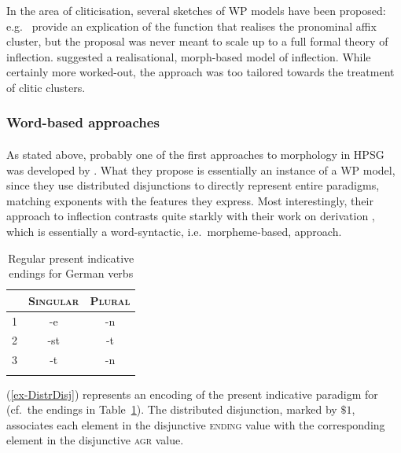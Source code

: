 \documentclass[output=paper
 	        ,biblatex
                ,babelshorthands
                ,newtxmath
                ,draftmode
                ,colorlinks, citecolor=brown
]{langscibook}
\begin{document}
In the area of cliticisation, several sketches of WP models have been
proposed: e.g.\ \citet{Miller97} provide an explication of the function
that realises the pronominal affix cluster, but the proposal was never
meant to scale up to a full formal theory of
inflection. \citet{crysmann_b03book} suggested a realisational,
morph-based model of inflection. While certainly more worked-out, the
approach was too tailored towards the treatment of clitic
clusters. 



\subsubsection{Word-based approaches}

\paragraph*{\citet{Krieger:Nerbonne:93}}
As stated above, probably one of the first approach\-es to morphology
in HPSG was developed by \citet{Krieger:Nerbonne:93}. What they
propose is essentially an instance of a WP model, since they use
distributed disjunctions to directly represent entire paradigms,
matching exponents with the features they express. Most interestingly,
their approach to inflection contrasts quite starkly with their
work on derivation \citep{Krieger:Nerbonne:93}, which is essentially a
word-syntactic, i.e.\ morpheme-based, approach.


\begin{table}[htb]
  \centering
  \begin{tabular}{r|cc}
    \lsptoprule
    & \textsc{Singular} & \textsc{Plural}\\
    \midrule
    1 & -e & -n\\
    2 & -st & -t\\
    3 & -t & -n\\
    \lspbottomrule
  \end{tabular}
  \caption{Regular present indicative endings for  German verbs}
  \label{tab:GermanEndings}
\end{table}

(\ref{ex-DistrDisj}) represents an encoding of the present
indicative paradigm for  (cf.\ the endings in Table~\ref{tab:GermanEndings}). The distributed disjunction, marked by ${\$
  1}$, associates each element in the disjunctive \textsc{ending}
value with the corresponding element in the disjunctive \textsc{agr}
value.  
\end{document}
